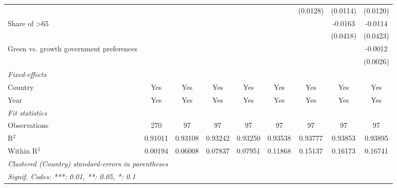 \begin{table}[htbp]
\begin{tabular}{lcccccccc}
                                                   &          &          &          &          &          & (0.0128) & (0.0114)      & (0.0120)\\   
      Share of >65                                 &          &          &          &          &          &          & -0.0163       & -0.0114\\   
                                                   &          &          &          &          &          &          & (0.0418)      & (0.0423)\\   
      Green vs. growth government preferences      &          &          &          &          &          &          &               & -0.0012\\   
                                                   &          &          &          &          &          &          &               & (0.0026)\\   
      \midrule
      \emph{Fixed-effects}\\
      Country                                      & Yes      & Yes      & Yes      & Yes      & Yes      & Yes      & Yes           & Yes\\  
      Year                                         & Yes      & Yes      & Yes      & Yes      & Yes      & Yes      & Yes           & Yes\\  
      \midrule
      \emph{Fit statistics}\\
      Observations                                 & 270      & 97       & 97       & 97       & 97       & 97       & 97            & 97\\  
      R$^2$                                        & 0.91011  & 0.93108  & 0.93242  & 0.93250  & 0.93538  & 0.93777  & 0.93853       & 0.93895\\  
      Within R$^2$                                 & 0.00194  & 0.06008  & 0.07837  & 0.07951  & 0.11868  & 0.15137  & 0.16173       & 0.16741\\  
      \midrule \midrule
      \multicolumn{9}{l}{\emph{Clustered (Country) standard-errors in parentheses}}\\
      \multicolumn{9}{l}{\emph{Signif. Codes: ***: 0.01, **: 0.05, *: 0.1}}\\
   \end{tabular}
\end{table}


